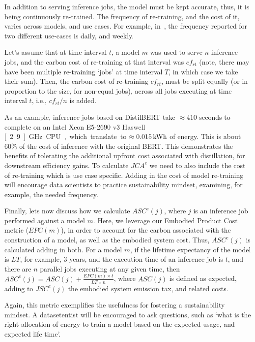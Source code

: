 {{        In addition  to serving inference jobs, the model must be kept accurate, thus, it is being continuously re-trained. The frequency of re-training, and the cost of it, varies across models, and use cases. For example, in~\cite{Wu2022}, the frequency reported for two different use-cases is daily, and weekly.

        Let's assume that at time interval $t$, a model $m$ was used to serve $n$ inference jobs, and the carbon cost of re-training at that interval was $cf_{rt}$ (note, there may have been multiple re-training `jobs' at time interval $T$, in which case we take their sum). Then, the carbon cost of re-training $cf_{rt}$, must be split equally (or in proportion to the size, for non-equal jobs), across all jobs executing at time interval $t$, i.e., $cf_{rt} / n$ is added.

        As an example, inference jobs based on DistilBERT take $\approx 410$ seconds to complete on an Intel Xeon E5-2690 v3 Haswell \unit[2.9]{GHz} CPU, which translate to $\approx \unit[0.015]{kWh}$ of energy. This is about $60\%$ of the cost of inference with the original BERT. This demonstrates the benefits of tolerating the additional upfront cost associated with  distillation, for downstream efficiency gains. To calculate $JCA^{e}$ we need to also include the cost of re-training which is use case specific. Adding in the cost of model re-training will encourage data scientists to practice sustainability mindset, examining, for example, the needed frequency.

        Finally, lets now discuss how we calculate $ASC^{e} \! \left ( j \right )$, where $j$ is an inference job performed against a model $m$. Here, we leverage our Embodied Product Cost metric ($EPC \! \left ( m \right )$), in order to account for the carbon associated with  the construction of a model, as well as the embodied system cost. Thus, $ASC^{e} \! \left ( j \right )$ is calculated adding in both. For a model $m$, if the lifetime expectancy of the model is $LT$, for example, $3$ years, and the execution time of an inference job is $t$, and there are $n$ parallel jobs executing at any given time, then $ASC^{e} \! \left ( j \right ) = ASC \! \left ( j \right ) + \frac{EPC \left ( m \right ) \times t}{LT \times n}$, where $ASC \! \left ( j \right )$ is defined as expected, adding to $JSC^{e} \! \left ( j \right )$ the embodied system emission tax, and related costs.

        Again, this metric exemplifies the usefulness for fostering a sustainability mindset. A datasetentist will be encouraged to ask questions, such as `what is the right allocation of energy to train a model based on the expected usage, and expected life time'.
    }
}
